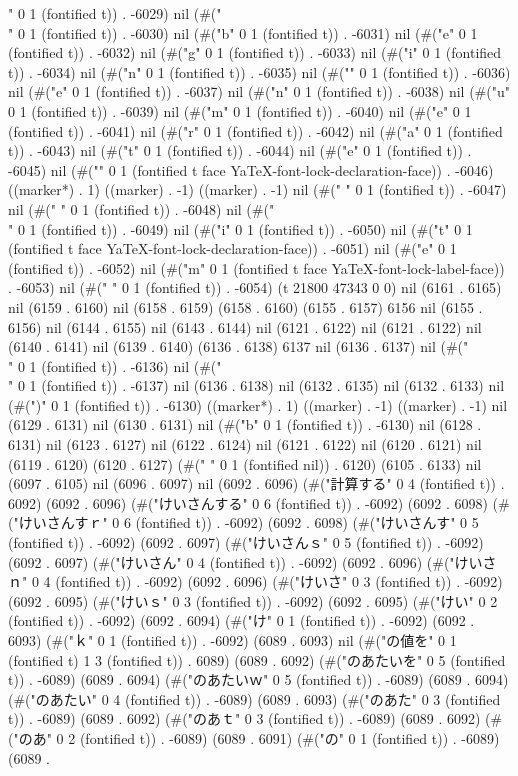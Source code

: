 " 0 1 (fontified t)) . -6029) nil (#("\\" 0 1 (fontified t)) . -6030) nil (#("b" 0 1 (fontified t)) . -6031) nil (#("e" 0 1 (fontified t)) . -6032) nil (#("g" 0 1 (fontified t)) . -6033) nil (#("i" 0 1 (fontified t)) . -6034) nil (#("n" 0 1 (fontified t)) . -6035) nil (#("{" 0 1 (fontified t)) . -6036) nil (#("e" 0 1 (fontified t)) . -6037) nil (#("n" 0 1 (fontified t)) . -6038) nil (#("u" 0 1 (fontified t)) . -6039) nil (#("m" 0 1 (fontified t)) . -6040) nil (#("e" 0 1 (fontified t)) . -6041) nil (#("r" 0 1 (fontified t)) . -6042) nil (#("a" 0 1 (fontified t)) . -6043) nil (#("t" 0 1 (fontified t)) . -6044) nil (#("e" 0 1 (fontified t)) . -6045) nil (#("}" 0 1 (fontified t face YaTeX-font-lock-declaration-face)) . -6046) ((marker*) . 1) ((marker) . -1) ((marker) . -1) nil (#("
" 0 1 (fontified t)) . -6047) nil (#(" " 0 1 (fontified t)) . -6048) nil (#("\\" 0 1 (fontified t)) . -6049) nil (#("i" 0 1 (fontified t)) . -6050) nil (#("t" 0 1 (fontified t face YaTeX-font-lock-declaration-face)) . -6051) nil (#("e" 0 1 (fontified t)) . -6052) nil (#("m" 0 1 (fontified t face YaTeX-font-lock-label-face)) . -6053) nil (#(" " 0 1 (fontified t)) . -6054) (t 21800 47343 0 0) nil (6161 . 6165) nil (6159 . 6160) nil (6158 . 6159) (6158 . 6160) (6155 . 6157) 6156 nil (6155 . 6156) nil (6144 . 6155) nil (6143 . 6144) nil (6121 . 6122) nil (6121 . 6122) nil (6140 . 6141) nil (6139 . 6140) (6136 . 6138) 6137 nil (6136 . 6137) nil (#("\\" 0 1 (fontified t)) . -6136) nil (#("\\" 0 1 (fontified t)) . -6137) nil (6136 . 6138) nil (6132 . 6135) nil (6132 . 6133) nil (#(")" 0 1 (fontified t)) . -6130) ((marker*) . 1) ((marker) . -1) ((marker) . -1) nil (6129 . 6131) nil (6130 . 6131) nil (#("b" 0 1 (fontified t)) . -6130) nil (6128 . 6131) nil (6123 . 6127) nil (6122 . 6124) nil (6121 . 6122) nil (6120 . 6121) nil (6119 . 6120) (6120 . 6127) (#("	" 0 1 (fontified nil)) . 6120) (6105 . 6133) nil (6097 . 6105) nil (6096 . 6097) nil (6092 . 6096) (#("計算する" 0 4 (fontified t)) . 6092) (6092 . 6096) (#("けいさんする" 0 6 (fontified t)) . -6092) (6092 . 6098) (#("けいさんすｒ" 0 6 (fontified t)) . -6092) (6092 . 6098) (#("けいさんす" 0 5 (fontified t)) . -6092) (6092 . 6097) (#("けいさんｓ" 0 5 (fontified t)) . -6092) (6092 . 6097) (#("けいさん" 0 4 (fontified t)) . -6092) (6092 . 6096) (#("けいさｎ" 0 4 (fontified t)) . -6092) (6092 . 6096) (#("けいさ" 0 3 (fontified t)) . -6092) (6092 . 6095) (#("けいｓ" 0 3 (fontified t)) . -6092) (6092 . 6095) (#("けい" 0 2 (fontified t)) . -6092) (6092 . 6094) (#("け" 0 1 (fontified t)) . -6092) (6092 . 6093) (#("ｋ" 0 1 (fontified t)) . -6092) (6089 . 6093) nil (#("の値を" 0 1 (fontified t) 1 3 (fontified t)) . 6089) (6089 . 6092) (#("のあたいを" 0 5 (fontified t)) . -6089) (6089 . 6094) (#("のあたいｗ" 0 5 (fontified t)) . -6089) (6089 . 6094) (#("のあたい" 0 4 (fontified t)) . -6089) (6089 . 6093) (#("のあた" 0 3 (fontified t)) . -6089) (6089 . 6092) (#("のあｔ" 0 3 (fontified t)) . -6089) (6089 . 6092) (#("のあ" 0 2 (fontified t)) . -6089) (6089 . 6091) (#("の" 0 1 (fontified t)) . -6089) (6089 . 